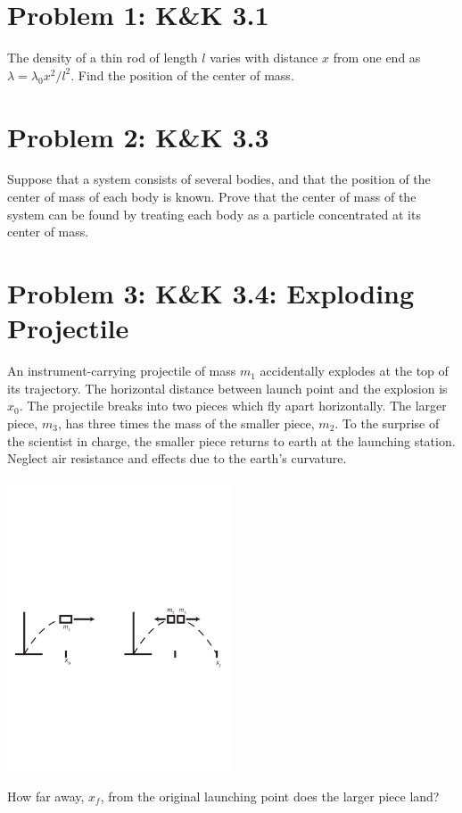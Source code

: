 \documentclass[problems]{esg8012pset}
\date{October 1}
\begin{document}
\section*{Problem 1: K\&K 3.1}
  The density of a thin rod of length $l$ varies with distance $x$ from one end as $\lambda = \lambda_0 x^2 / l^2$.  Find the position of the center of mass.
\section*{Problem 2: K\&K 3.3}
  Suppose that a system consists of several bodies, and that the position of the center of mass of each body is known. Prove that the center of mass of the system can be found by treating each body as a particle concentrated at its center of mass.
\section*{Problem 3: K\&K 3.4: Exploding Projectile}
  An instrument-carrying projectile of mass $m_1$ accidentally explodes at the top of its trajectory. The horizontal distance between launch point and the explosion is $x_0$.  The projectile breaks into two pieces which fly apart horizontally. The larger piece, $m_3$, has three times the mass of the smaller piece, $m_2$. To the surprise of the scientist in charge, the smaller piece returns to earth at the launching station. Neglect air resistance and effects due to the earth's curvature.
  \begin{center}\includegraphics[width=0.5\textwidth]{ps_04_1}\end{center}
  How far away, $x_f$, from the original launching point does the larger piece land?
\end{document}
